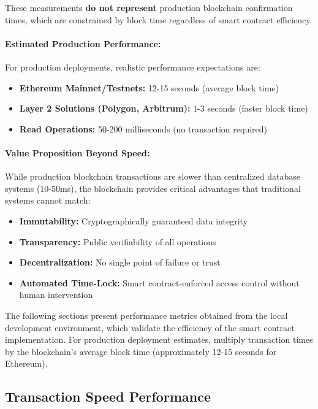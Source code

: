 \documentclass[12pt,a4paper]{article}
\begin{document}
These measurements \textbf{do not represent} production blockchain confirmation times, which are constrained by block time regardless of smart contract efficiency.

\paragraph{Estimated Production Performance:}
For production deployments, realistic performance expectations are:
\begin{itemize}
    \item \textbf{Ethereum Mainnet/Testnets:} 12-15 seconds (average block time)
    \item \textbf{Layer 2 Solutions (Polygon, Arbitrum):} 1-3 seconds (faster block time)
    \item \textbf{Read Operations:} 50-200 milliseconds (no transaction required)
\end{itemize}

\paragraph{Value Proposition Beyond Speed:}
While production blockchain transactions are slower than centralized database systems (10-50ms), the blockchain provides critical advantages that traditional systems cannot match:
\begin{itemize}
    \item \textbf{Immutability:} Cryptographically guaranteed data integrity
    \item \textbf{Transparency:} Public verifiability of all operations
    \item \textbf{Decentralization:} No single point of failure or trust
    \item \textbf{Automated Time-Lock:} Smart contract-enforced access control without human intervention
\end{itemize}

The following sections present performance metrics obtained from the local development environment, which validate the efficiency of the smart contract implementation. For production deployment estimates, multiply transaction times by the blockchain's average block time (approximately 12-15 seconds for Ethereum).

\subsection{Transaction Speed Performance}
\end{document}
